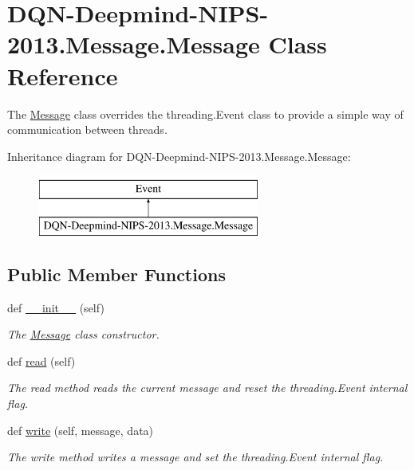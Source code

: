 \hypertarget{classDQN-Deepmind-NIPS-2013_1_1Message_1_1Message}{}\section{D\+Q\+N-\/\+Deepmind-\/\+N\+I\+P\+S-\/2013.Message.\+Message Class Reference}
\label{classDQN-Deepmind-NIPS-2013_1_1Message_1_1Message}


The \hyperlink{classDQN-Deepmind-NIPS-2013_1_1Message_1_1Message}{Message} class overrides the threading.\+Event class to provide a simple way of communication between threads.  


Inheritance diagram for D\+Q\+N-\/\+Deepmind-\/\+N\+I\+P\+S-\/2013.Message.\+Message\+:\begin{figure}[H]
\begin{center}
\leavevmode
\includegraphics[height=2.000000cm]{classDQN-Deepmind-NIPS-2013_1_1Message_1_1Message}
\end{center}
\end{figure}
\subsection*{Public Member Functions}
\begin{DoxyCompactItemize}
\item 
def \hyperlink{classDQN-Deepmind-NIPS-2013_1_1Message_1_1Message_a2fdcb857df94a7edc9b6e36ef0a8e1c6}{\+\_\+\+\_\+init\+\_\+\+\_\+} (self)
\begin{DoxyCompactList}\small\item\em The \hyperlink{classDQN-Deepmind-NIPS-2013_1_1Message_1_1Message}{Message} class constructor. \end{DoxyCompactList}\item 
def \hyperlink{classDQN-Deepmind-NIPS-2013_1_1Message_1_1Message_a7f12ede11926bee5d5b3946375f28156}{read} (self)
\begin{DoxyCompactList}\small\item\em The read method reads the current message and reset the threading.\+Event internal flag. \end{DoxyCompactList}\item 
def \hyperlink{classDQN-Deepmind-NIPS-2013_1_1Message_1_1Message_a53cf5ac601122f2ace3178abee8f81db}{write} (self, message, data)
\begin{DoxyCompactList}\small\item\em The write method writes a message and set the threading.\+Event internal flag. \end{DoxyCompactList}\end{DoxyCompactItemize}
